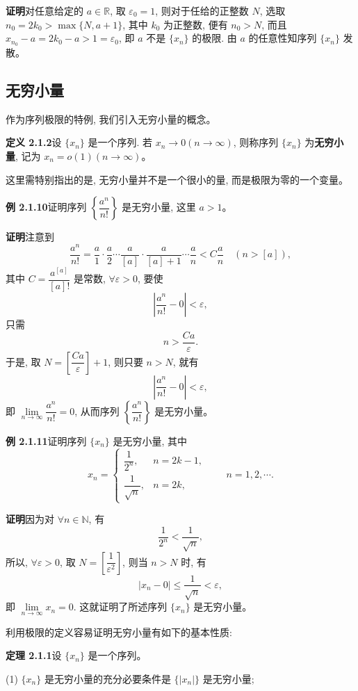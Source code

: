 \documentclass[UTF8,12pt,a4paper,fontset=fandol]{ctexart}
\begin{document}
\noindent\textbf{证明}\quad 对任意给定的 $a\in\mathbb{R}$, 取 $\varepsilon_0=1$, 则对于任给的正整数 $N$, 选取 $n_0=2k_0>\max\{N,a+1\}$, 其中 $k_0$ 为正整数, 便有 $n_0>N$, 而且 $x_{n_0}-a=2k_0-a>1=\varepsilon_0$, 即 $a$ 不是 $\{x_n\}$ 的极限. 由 $a$ 的任意性知序列 $\{x_n\}$ 发散。

\subsection{无穷小量}

作为序列极限的特例, 我们引入无穷小量的概念。

\noindent\textbf{定义 2.1.2}\quad 设 $\{x_n\}$ 是一个序列. 若 $x_n\to0(n\to\infty)$, 则称序列 $\{x_n\}$ 为\textbf{无穷小量}, 记为 $x_n=o(1)(n\to\infty)$。

这里需特别指出的是, 无穷小量并不是一个很小的量, 而是极限为零的一个变量。

\noindent\textbf{例 2.1.10}\quad 证明序列 $\left\{\dfrac{a^n}{n!}\right\}$ 是无穷小量, 这里 $a>1$。

\noindent\textbf{证明}\quad 注意到
\[
  \frac{a^n}{n!}
  =
  \frac a1\cdot\frac a2\cdots\frac a{[a]}\cdot
  \frac a{[a]+1}\cdots\frac an
  < C\frac an
  \quad(n>[a]),
\]
其中 $C=\dfrac{a^{[a]}}{[a]!}$ 是常数, $\forall\varepsilon>0$, 要使
\[
  \left|\frac{a^n}{n!}-0\right|<\varepsilon,
\]
只需
\[
  n>\frac{Ca}{\varepsilon}.
\]
于是, 取 $N=\left[\dfrac{Ca}{\varepsilon}\right]+1$, 则只要 $n>N$, 就有
\[
  \left|\frac{a^n}{n!}-0\right|<\varepsilon,
\]
即 $\lim\limits_{n\to\infty}\dfrac{a^n}{n!}=0$, 从而序列 $\left\{\dfrac{a^n}{n!}\right\}$ 是无穷小量。

\noindent\textbf{例 2.1.11}\quad 证明序列 $\{x_n\}$ 是无穷小量, 其中
\[
  x_n=
  \begin{cases}
    \dfrac1{2^n}, & n=2k-1,\\[0.4em]
    \dfrac1{\sqrt n}, & n=2k,
  \end{cases}
  \qquad n=1,2,\cdots .
\]

\noindent\textbf{证明}\quad 因为对 $\forall n\in\mathbb{N}$, 有
\[
  \frac1{2^n}<\frac1{\sqrt n},
\]
所以, $\forall\varepsilon>0$, 取 $N=\left[\dfrac1{\varepsilon^2}\right]$, 则当 $n>N$ 时, 有
\[
  |x_n-0|\leqslant\frac1{\sqrt n}<\varepsilon,
\]
即 $\lim\limits_{n\to\infty}x_n=0$. 这就证明了所述序列 $\{x_n\}$ 是无穷小量。

利用极限的定义容易证明无穷小量有如下的基本性质:

\noindent\textbf{定理 2.1.1}\quad 设 $\{x_n\}$ 是一个序列。

(1) $\{x_n\}$ 是无穷小量的充分必要条件是 $\{|x_n|\}$ 是无穷小量;
\end{document}
